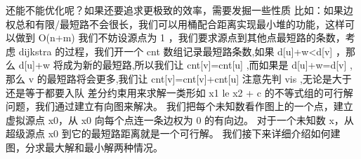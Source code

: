 {}\markdownRendererInterblockSeparator
{}还能不能优化呢？如果还要追求更极致的效率，需要发掘一些性质\markdownRendererParagraphSeparator
{}比如：如果边权总和有限/最短路不会很长，我们可以用桶配合距离实现最小堆的功能，这样可以做到\markdownRendererDollarSign{} O(n+m) \markdownRendererDollarSign{}\markdownRendererInterblockSeparator
{}
\markdownRendererSectionEnd \markdownRendererSectionBegin
{}\markdownRendererInterblockSeparator
{}我们不妨设源点为\markdownRendererDollarSign{} 1 \markdownRendererDollarSign{}，我们要求源点到其他点最短路的条数，考虑\markdownRendererDollarSign{} dijkstra \markdownRendererDollarSign{}的过程，我们开一个\markdownRendererDollarSign{} cnt \markdownRendererDollarSign{}数组记录最短路条数,如果\markdownRendererDollarSign{} d[u]+w<d[v] \markdownRendererDollarSign{}，那么\markdownRendererDollarSign{} d[u]+w \markdownRendererDollarSign{}将成为新的最短路,所以我们让\markdownRendererDollarSign{} cnt[v]=cnt[u] \markdownRendererDollarSign{},而如果是\markdownRendererDollarSign{} d[u]+w=d[v] \markdownRendererDollarSign{},那么\markdownRendererDollarSign{} v \markdownRendererDollarSign{}的最短路将会更多,我们让\markdownRendererDollarSign{} cnt[v]=cnt[v]+cnt[u] \markdownRendererDollarSign{}\markdownRendererParagraphSeparator
{}注意先判\markdownRendererDollarSign{} vis \markdownRendererDollarSign{},无论是大于还是等于都要入队\markdownRendererInterblockSeparator
{}
\markdownRendererSectionEnd \markdownRendererSectionBegin
{}\markdownRendererInterblockSeparator
{}差分约束用来求解一类形如 \markdownRendererDollarSign{}x\markdownRendererUnderscore{}1 \markdownRendererBackslash{}le x\markdownRendererUnderscore{}2 + c\markdownRendererDollarSign{} 的不等式组的可行解问题，我们通过建立有向图来解决。\markdownRendererParagraphSeparator
{}我们把每个未知数看作图上的一个点，建立虚拟源点 \markdownRendererDollarSign{}x\markdownRendererUnderscore{}0\markdownRendererDollarSign{}，从 \markdownRendererDollarSign{}x\markdownRendererUnderscore{}0\markdownRendererDollarSign{} 向每个点连一条边权为 \markdownRendererDollarSign{}0\markdownRendererDollarSign{} 的有向边。\markdownRendererHardLineBreak
{}对于一个未知数 \markdownRendererDollarSign{}x\markdownRendererDollarSign{}，从超级源点 \markdownRendererDollarSign{}x\markdownRendererUnderscore{}0\markdownRendererDollarSign{} 到它的最短路距离就是一个可行解。\markdownRendererParagraphSeparator
{}我们接下来详细介绍如何建图，分求最大解和最小解两种情况。\markdownRendererParagraphSeparator

